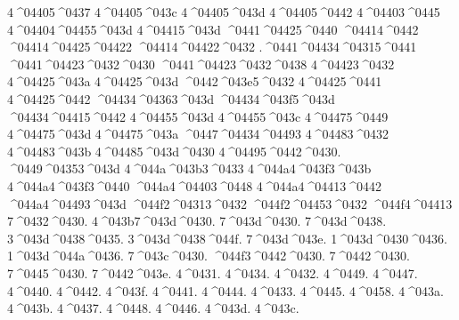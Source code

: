 {4^^^^04405^^^^0437
4^^^^04405^^^^043c
4^^^^04405^^^^043d
4^^^^04405^^^^0442
4^^^^04403^^^^0445
4^^^^04404^^^^04455^^^^043d
4^^^^04415^^^^043d
^^^^0441^^^^04425^^^^0440
^^^^04414^^^^0442
^^^^04414^^^^04425^^^^04422
^^^^04414^^^^04422^^^^0432
.^^^^0441^^^^04434^^^^04315^^^^0441
^^^^0441^^^^04423^^^^0432^^^^0430
^^^^0441^^^^04423^^^^0432^^^^0438
4^^^^04423^^^^0432
4^^^^04425^^^^043a
4^^^^04425^^^^043d
^^^^0442^^^^043e5^^^^0432
4^^^^04425^^^^0441
4^^^^04425^^^^0442
^^^^04434^^^^04363^^^^043d
^^^^04434^^^^043f5^^^^043d
^^^^04434^^^^04415^^^^0442
4^^^^04455^^^^043d
4^^^^04455^^^^043c
4^^^^04475^^^^0449
4^^^^04475^^^^043d
4^^^^04475^^^^043a
^^^^0447^^^^04434^^^^04493
4^^^^04483^^^^0432
4^^^^04483^^^^043b
4^^^^04485^^^^043d^^^^0430
4^^^^04495^^^^0442^^^^0430.
^^^^0449^^^^04353^^^^043d
4^^^^044a^^^^043b3^^^^0433
4^^^^044a4^^^^043f3^^^^043b
4^^^^044a4^^^^043f3^^^^0440
^^^^044a4^^^^04403^^^^0448
4^^^^044a4^^^^04413^^^^0442
^^^^044a4^^^^04493^^^^043d
^^^^044f2^^^^04313^^^^0432
^^^^044f2^^^^04453^^^^0432
^^^^044f4^^^^04413
7^^^^0432^^^^0430.
4^^^^043b7^^^^043d^^^^0430.
7^^^^043d^^^^0430.
7^^^^043d^^^^0438.
3^^^^043d^^^^0438^^^^0435.
3^^^^043d^^^^0438^^^^044f.
7^^^^043d^^^^043e.
1^^^^043d^^^^0430^^^^0436.
1^^^^043d^^^^044a^^^^0436.
7^^^^043c^^^^0430.
^^^^044f3^^^^0442^^^^0430.
7^^^^0442^^^^0430.
7^^^^0445^^^^0430.
7^^^^0442^^^^043e.
4^^^^0431.
4^^^^0434.
4^^^^0432.
4^^^^0449.
4^^^^0447.
4^^^^0440.
4^^^^0442.
4^^^^043f.
4^^^^0441.
4^^^^0444.
4^^^^0433.
4^^^^0445.
4^^^^0458.
4^^^^043a.
4^^^^043b.
4^^^^0437.
4^^^^0448.
4^^^^0446.
4^^^^043d.
4^^^^043c.
}

